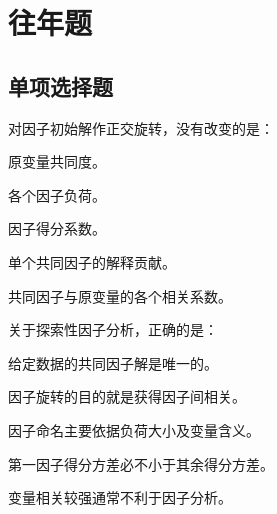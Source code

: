 
\label{chapter:2}

\section{往年题}

\par\addvspace{6pt}\noindent\begin{minipage}{\linewidth}

\subsection{单项选择题}


对因子初始解作正交旋转，没有改变的是：


\begin{choices}

\item 原变量共同度。

\item 各个因子负荷。

\item 因子得分系数。

\item 单个共同因子的解释贡献。

\item 共同因子与原变量的各个相关系数。

\end{choices}

\end{minipage}\par\vspace{4pt}

\par\addvspace{6pt}\noindent\begin{minipage}{\linewidth}


关于探索性因子分析，正确的是：


\begin{choices}

\item 给定数据的共同因子解是唯一的。

\item 因子旋转的目的就是获得因子间相关。

\item 因子命名主要依据负荷大小及变量含义。

\item 第一因子得分方差必不小于其余得分方差。

\item 变量相关较强通常不利于因子分析。

\end{choices}

\end{minipage}\par\vspace{4pt}

